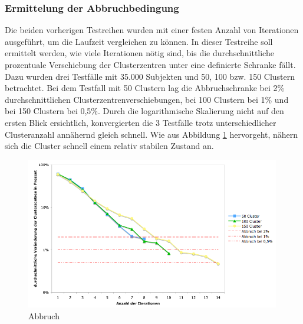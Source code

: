\documentclass[a4paper]{llncs}
\begin{document}
\subsubsection{Ermittelung der Abbruchbedingung}
Die beiden vorherigen Testreihen wurden mit einer festen Anzahl von Iterationen ausgeführt, um die Laufzeit vergleichen zu können. In dieser Testreihe soll ermittelt werden, wie viele Iterationen nötig sind, bis die durchschnittliche prozentuale Verschiebung der Clusterzentren unter eine definierte Schranke fällt.
Dazu wurden drei Testfälle mit 35.000 Subjekten und 50, 100 bzw. 150 Clustern betrachtet. Bei dem Testfall mit 50 Clustern lag die Abbruchschranke bei 2\% durchschnittlichen Clusterzentrenverschiebungen, bei 100 Clustern bei 1\% und bei 150 Clustern bei 0,5\%.
Durch die logarithmische Skalierung nicht auf den ersten Blick ersichtlich, konvergierten die 3 Testfälle trotz unterschiedlicher Clusteranzahl annähernd gleich schnell.
Wie aus Abbildung \ref{fig:iterations} hervorgeht, nähern sich die Cluster schnell einem relativ stabilen Zustand an.
\begin{figure}[!ht]
\centering
\includegraphics[width=0.99\textwidth]{charts/iterations_log.png}
\caption{Abbruch}
\label{fig:iterations}
\end{figure}
\end{document}
